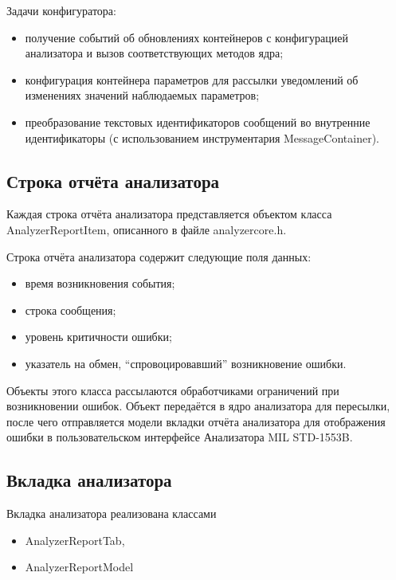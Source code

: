Задачи конфигуратора:

\begin{itemize}
 \item получение событий об обновлениях контейнеров с конфигурацией анализатора 
и вызов соответствующих методов ядра;
 \item конфигурация контейнера параметров для рассылки уведомлений об 
изменениях значений наблюдаемых параметров;
 \item преобразование текстовых идентификаторов сообщений во внутренние 
идентификаторы (с использованием инструментария MessageContainer).
\end{itemize}

\subsection{Строка отчёта анализатора}
\label{subsec:reportitem}

Каждая строка отчёта анализатора представляется объектом класса 
AnalyzerReportItem, описанного в файле analyzercore.h.

Строка отчёта анализатора содержит следующие поля данных:

\begin{itemize}
 \item время возникновения события;
 \item строка сообщения;
 \item уровень критичности ошибки;
 \item указатель на обмен, ``спровоцировавший'' возникновение ошибки.
\end{itemize}

Объекты этого класса рассылаются обработчиками ограничений при возникновении 
ошибок. Объект передаётся в ядро анализатора для пересылки, после чего 
отправляется модели вкладки отчёта анализатора для отображения ошибки в 
пользовательском интерфейсе Анализатора MIL STD-1553B.

\subsection{Вкладка анализатора}

Вкладка анализатора реализована классами

\begin{itemize}
 \item AnalyzerReportTab,
 \item AnalyzerReportModel
\end{itemize}

